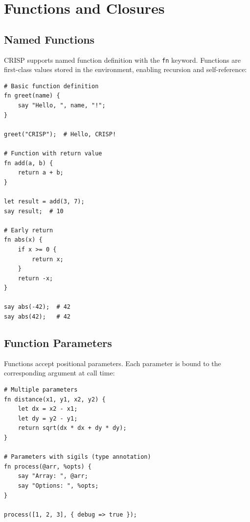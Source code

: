 \section{Functions and Closures}

\subsection{Named Functions}

CRISP supports named function definition with the \texttt{fn} keyword. Functions are first-class values stored in the environment, enabling recursion and self-reference:

\begin{tcolorbox}[colback=codebg, colframe=darkpurple, colbacktitle=darkpurple, title=\textbf{\textcolor{codegold}{Named Functions}}, fonttitle=\bfseries, sharp corners]
\begin{lstlisting}
# Basic function definition
fn greet(name) {
    say "Hello, ", name, "!";
}

greet("CRISP");  # Hello, CRISP!

# Function with return value
fn add(a, b) {
    return a + b;
}

let result = add(3, 7);
say result;  # 10

# Early return
fn abs(x) {
    if x >= 0 {
        return x;
    }
    return -x;
}

say abs(-42);  # 42
say abs(42);   # 42
\end{lstlisting}
\end{tcolorbox}

\subsection{Function Parameters}

Functions accept positional parameters. Each parameter is bound to the corresponding argument at call time:

\begin{tcolorbox}[colback=codebg, colframe=darkpurple, colbacktitle=darkpurple, title=\textbf{\textcolor{codegold}{Function Parameters}}, fonttitle=\bfseries, sharp corners]
\begin{lstlisting}
# Multiple parameters
fn distance(x1, y1, x2, y2) {
    let dx = x2 - x1;
    let dy = y2 - y1;
    return sqrt(dx * dx + dy * dy);
}

# Parameters with sigils (type annotation)
fn process(@arr, %opts) {
    say "Array: ", @arr;
    say "Options: ", %opts;
}

process([1, 2, 3], { debug => true });
\end{lstlisting}
\end{tcolorbox}

